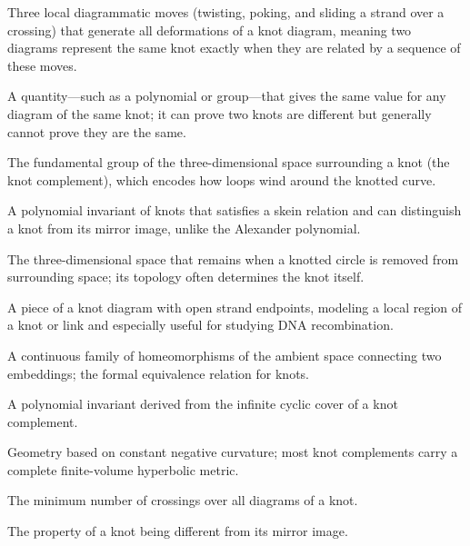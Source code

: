 \begin{description}[leftmargin=*,style=nextline,itemsep=0.3em]
\item[\textbf{Reidemeister moves.}] Three local diagrammatic moves (twisting, poking, and sliding a strand over a crossing) that generate all deformations of a knot diagram, meaning two diagrams represent the same knot exactly when they are related by a sequence of these moves.
\item[\textbf{Knot invariant.}] A quantity---such as a polynomial or group---that gives the same value for any diagram of the same knot; it can prove two knots are different but generally cannot prove they are the same.
\item[\textbf{Knot group.}] The fundamental group of the three-dimensional space surrounding a knot (the knot complement), which encodes how loops wind around the knotted curve.
\item[\textbf{Jones polynomial.}] A polynomial invariant of knots that satisfies a skein relation and can distinguish a knot from its mirror image, unlike the Alexander polynomial.
\item[\textbf{Knot complement.}] The three-dimensional space that remains when a knotted circle is removed from surrounding space; its topology often determines the knot itself.
\item[\textbf{Tangle.}] A piece of a knot diagram with open strand endpoints, modeling a local region of a knot or link and especially useful for studying DNA recombination.
\item[\textbf{Ambient isotopy.}] A continuous family of homeomorphisms of the ambient space connecting two embeddings; the formal equivalence relation for knots.
\item[\textbf{Alexander polynomial.}] A polynomial invariant derived from the infinite cyclic cover of a knot complement.
\item[\textbf{Hyperbolic geometry.}] Geometry based on constant negative curvature; most knot complements carry a complete finite-volume hyperbolic metric.
\item[\textbf{Crossing number.}] The minimum number of crossings over all diagrams of a knot.
\item[\textbf{Chirality.}] The property of a knot being different from its mirror image.
\end{description}

